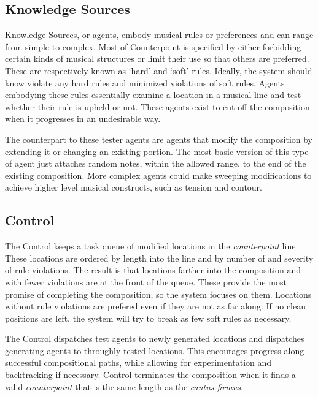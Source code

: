 
\subsection{Knowledge Sources} %

Knowledge Sources, or agents, embody musical rules or preferences and can range from simple to complex.
Most of Counterpoint is specified by either forbidding certain kinds of musical structures or limit their use so that others are preferred.
These are respectively known as `hard' and `soft' rules. Ideally, the system should know violate any hard rules and minimized violations of soft rules.
Agents embodying these rules essentially examine a location in a musical line and test whether their rule is upheld or not.
These agents exist to cut off the composition when it progresses in an undesirable way.

The counterpart to these tester agents are agents that modify the composition by extending it or changing an existing portion.
The most basic version of this type of agent just attaches random notes, within the allowed range, to the end of the existing composition.
More complex agents could make sweeping modifications to achieve higher level musical constructs, such as tension and contour.

\subsection{Control} %

The Control keeps a task queue of modified locations in the \emph{counterpoint} line.
These locations are ordered by length into the line and by number of and severity of rule violations.
The result is that locations farther into the composition and with fewer violations are at the front of the queue.
These provide the most promise of completing the composition, so the system focuses on them.
Locations without rule violations are prefered even if they are not as far along.
If no clean positions are left, the system will try to break as few soft rules as necessary.

The Control dispatches test agents to newly generated locations and dispatches generating agents to throughly tested locations.
This encourages progress along successful compositional paths, while allowing for experimentation and backtracking if necessary.
Control terminates the composition when it finds a valid \emph{counterpoint} that is the same length as the \emph{cantus firmus}.
